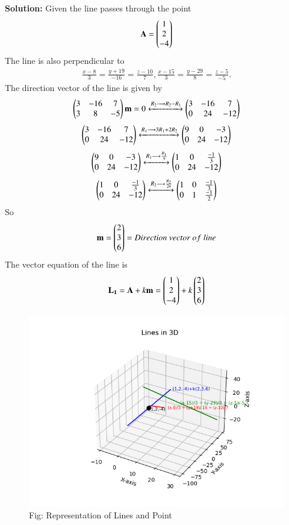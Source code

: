 \documentclass[journal]{IEEEtran}
\begin{document}
\textbf{Solution:} Given the line passes through the point
\begin{align}
\mathbf{A} = \begin{pmatrix}1\\2\\-4\end{pmatrix}
\end{align}
The line is also perpendicular to
\begin{align}
\frac{x-8}{3} = \frac{y+19}{-16} = \frac{z-10}{7} ,
\frac{x-15}{3} = \frac{y-29}{8} = \frac{z-5}{-5}.
\end{align}
The direction vector of the line is given by
\begin{align}
\begin{pmatrix}
3 & -16 & 7 \\
3 & 8 & -5\end{pmatrix} \mathbf{m} = 0 \xleftrightarrow{R_2\longrightarrow R_2-R_1}
\begin{pmatrix}
3 & -16 & 7 \\
0 & 24 & -12\end{pmatrix}
\end{align}
\begin{align}
\begin{pmatrix}
3 & -16 & 7 \\
0 & 24 & -12\end{pmatrix} \xleftrightarrow{R_1\longrightarrow 3R_1+2R_2}
\begin{pmatrix}
9 & 0 & -3 \\
0 & 24 & -12\end{pmatrix}
\end{align}
\begin{align}
\begin{pmatrix}
9 & 0 & -3 \\
0 & 24 & -12\end{pmatrix} \xleftrightarrow{R_1\longrightarrow \frac{R_1}{9}}
\begin{pmatrix}
1 & 0 & \frac{-1}{3} \\
0 & 24 & -12\end{pmatrix}
\end{align}
\begin{align}
\begin{pmatrix}
1 & 0 & \frac{-1}{3} \\
0 & 24 & -12\end{pmatrix} \xleftrightarrow{R_2\longrightarrow \frac{R_2}{24}}
\begin{pmatrix}
1 & 0 & \frac{-1}{3} \\
0 & 1 & \frac{-1}{2}\end{pmatrix} 
\end{align}
So \begin{align}
\mathbf{m}=\begin{pmatrix}2\\3\\6\end{pmatrix} = Direction \ vector \ of \ line
\end{align}
The vector equation of the line is
\begin{align}
\mathbf{L_1} = \mathbf{A}+k\mathbf{m} = \begin{pmatrix}1\\2\\-4\end{pmatrix}+k\begin{pmatrix}2\\3\\6\end{pmatrix}
\end{align}

\begin{figure}[h!]
  \centering
  \includegraphics[width=0.9\columnwidth]{figs/fig7.png} 
   \caption*{Fig: Representation of Lines and Point}
  \label{Fig7}
\end{figure}
\end{document}
